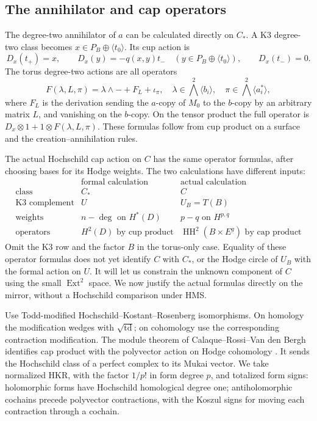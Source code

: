 \documentclass[11pt]{article}
\numberwithin{equation}{section}
\theoremstyle{definition}
\theoremstyle{remark}
\DeclareMathOperator{\HH}{HH}
\DeclareMathOperator{\Ext}{Ext}
\DeclareMathOperator{\td}{td}
\begin{document}
\subsection{The annihilator and cap operators}

The degree-two annihilator of \(a\) can be calculated directly on
\(C_*\).  A K3 degree-two class becomes
\(x\in P_B\oplus\langle t_0\rangle\).  Its cup action is
\begin{equation}\label{coh:lowering-k3}
 D_x(t_+)=x,\qquad
 D_x(y)=-q(x,y)t_-\quad
   (y\in P_B\oplus\langle t_0\rangle),\qquad
 D_x(t_-)=0.
\end{equation}
The torus degree-two actions are all operators
\begin{equation}\label{coh:lowering-torus}
 F(\lambda,L,\pi)=\lambda\wedge-+F_L+\iota_\pi,
 \quad
 \lambda\in\bigwedge^2\langle b_i\rangle,
 \quad \pi\in\bigwedge^2\langle a_i^*\rangle,
\end{equation}
where \(F_L\) is the derivation sending the \(a\)-copy of \(M_0\)
to the \(b\)-copy by an arbitrary matrix \(L\), and vanishing on the
\(b\)-copy.  On the tensor product the full operator is
\(D_x\otimes1+1\otimes F(\lambda,L,\pi)\).  These formulas follow
from cup product on a surface and the creation--annihilation rules.

The actual Hochschild cap action on \(C\) has the same operator
formulas, after choosing bases for its Hodge weights.  The two
calculations have different inputs:
\[
\begin{array}{c|c|c}
 &\text{formal calculation}&\text{actual calculation}\\ \hline
 \text{class}&C_*&C\\
 \text{K3 complement}&U&U_B=T(B)\\
 \text{weights}&n-\deg\text{ on }H^*(D)&p-q\text{ on }H^{p,q}\\
 \text{operators}&H^2(D)\text{ by cup product}
   &\HH^2(B\times E^g)\text{ by cap product}
\end{array}
\]
Omit the K3 row and the factor \(B\) in the torus-only case.
Equality of these operator formulas does not yet identify \(C\) with
\(C_*\), or the Hodge circle of \(U_B\) with the formal action on
\(U\).  It will let us constrain the unknown component of \(C\)
using the small \(\Ext^2\) space.  We now justify the actual formulas
directly on the mirror, without a Hochschild comparison under HMS.

Use Todd-modified Hochschild--Kostant--Rosenberg isomorphisms.  On
homology the modification wedges with \(\sqrt{\td}\); on cohomology
use the corresponding contraction modification.  The module theorem
of Calaque--Rossi--Van den Bergh identifies cap product with the
polyvector action on Hodge cohomology
\cite[Theorem~1.4]{CalaqueRossiVanDenBergh}.  It sends the Hochschild
class of a perfect complex to its Mukai vector.  We take normalized HKR,
with the factor \(1/p!\) in form degree \(p\), and totalized form
signs: holomorphic forms have Hochschild homological degree one;
antiholomorphic cochains precede polyvector contractions, with the
Koszul signs for moving each contraction through a cochain.
\end{document}
